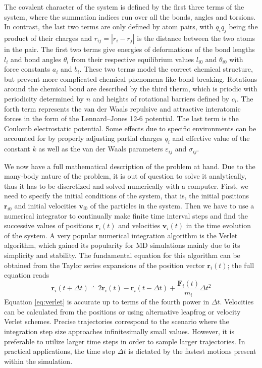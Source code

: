 The covalent character of the system is defined by the first three terms of
the system, where the summation indices run over all the bonds, angles and
torsions. In contrast, the last two terms are only defined by atom pairs,
with $q_i q_j$ being the product of their charges and $r_{ij} = |r_i - r_j|$
is the distance between the two atoms in the pair. The first two terms give
energies of deformations of the bond lengths $l_i$ and bond angles $\theta_i$
from their respective equilibrium values $l_{i0}$ and $\theta_{i0}$ with force
constants $a_i$ and $b_i$. These two terms model the correct chemical
structure, but prevent more complicated chemical phenomena like bond breaking.
Rotations around the chemical bond are described by the third therm, which is
priodic with periodicity determined by $n$ and heights of rotational barriers
defined by $c_i$. The forth term represents the van der Waals repulsive and
attractive interatomic forces in the form of the Lennard–Jones 12-6 potential.
The last term is the Coulomb electrostatic potential. Some effects due to
specific environments can be accounted for by properly adjusting partial
charges $q_i$ and effective value of the constant $k$ as well as the van der
Waals parameters $\varepsilon_{ij}$ and $\sigma_{ij}$.

We now have a full mathematical description of the problem at hand. Due to the
many-body nature of the problem, it is out of question to solve it
analytically, thus it has to be discretized and solved numerically with a
computer. First, we need to specify the initial conditions of the system,
that is, the initial positions $\mathbf{r}_{i0}$ and initial velocities
$\mathbf{v}_{i0}$ of the particles in the system. Then we have to use a
numerical integrator to continually make finite time interval steps and find
the successive values of positions $\mathbf{r}_i(t)$ and velocities
$\mathbf{v}_{i}(t)$ in the time evolution of the system. A very popular
numerical integration algorithm is the Verlet algorithm, which gained its
popularity for MD simulations mainly due to its simplicity and stability.
The fundamental equation for this algorithm can be obtained from the Taylor
series expansions of the position vector $\mathbf{r}_i(t)$; the full equation
reads
\begin{equation}
  \mathbf{r}_i (t + \Delta t) \doteq 2 \mathbf{r}_i(t)
    - \mathbf{r}_i(t - \Delta t) + \frac{\mathbf{F}_i(t)}{m_i} \Delta t^2
  \label{eq:verlet}
\end{equation}
Equation \eqref{eq:verlet} is accurate up to terms of the fourth power in
$\Delta t$. Velocities can be calculated from the positions or using
alternative leapfrog or velocity Verlet schemes. Precise trajectories
correspond to the scenario where the integration step size approaches
infinitesimally small values. However, it is preferable to utilize larger time
steps in order to sample larger trajectories. In practical applications, the
time step $\Delta t$ is dictated by the fastest motions present within the
simulation.

